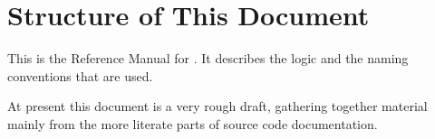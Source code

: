 \section{Structure of This Document}

This is the Reference Manual for . 
It describes the logic and the naming conventions
that are used.

At present this document is a very rough draft, gathering together
material mainly from the more literate parts of source code documentation.